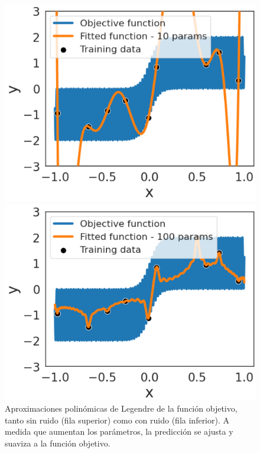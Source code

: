 \begin{figure}[h]
    \begin{minipage}{0.32\textwidth}
        \centering
        \includegraphics[width=\linewidth]{img/experiments/hiperbolica_noise1.2.png}
    \end{minipage}
    \begin{minipage}{0.32\textwidth}
        \centering
        \includegraphics[width=\linewidth]{img/experiments/hiperbolica_noise1.3.png}
    \end{minipage}
    \caption[Aproximaciones polinómicas de Legendre de la función objetivo, tanto sin ruido como con ruido.]{Aproximaciones polinómicas de Legendre de la función objetivo, tanto sin ruido (fila superior) como con ruido (fila inferior). A medida que aumentan los parámetros, la predicción se ajusta y suaviza a la función objetivo.}\label{fig:approx-hiperbolicas}
\end{figure}

